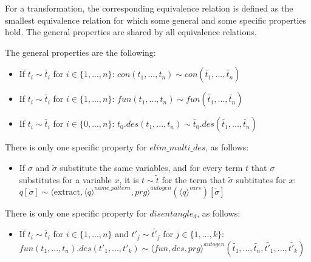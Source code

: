 \documentclass[11pt]{article} %
\begin{document}
For a transformation, the corresponding equivalence relation is defined as the smallest equivalence relation for which some general and some specific properties hold. The general properties are shared by all equivalence relations.

The general properties are the following:

\begin{itemize}

\item If $t_i \sim \widetilde{t_i}$ for $i \in \{1, ..., n\}$: $con(t_1, ..., t_n) \sim con(\widetilde{t_1}, ..., \widetilde{t_n})$

\item If $t_i \sim \widetilde{t_i}$ for $i \in \{1, ..., n\}$: $fun(t_1, ..., t_n) \sim fun(\widetilde{t_1}, ..., \widetilde{t_n})$

\item If $t_i \sim \widetilde{t_i}$ for $i \in \{0, ..., n\}$: $t_0.des(t_1, ..., t_n) \sim \widetilde{t_0}.des(\widetilde{t_1}, ..., \widetilde{t_n})$

\end{itemize}

There is only one specific property for $elim\_multi\_des$, as follows:

\begin{itemize}

\item If $\sigma$ and $\widetilde{\sigma}$ substitute the same variables, and for every term $t$ that $\sigma$ substitutes for a variable $x$, it is $t \sim \widetilde{t}$ for the term that $\widetilde{\sigma}$ subtitutes for $x$: $q[\sigma] \sim \langle \textrm{extract}, \langle q \rangle^{name\_pattern}, prg \rangle^{autogen}(\langle q \rangle^{vars})[\widetilde{\sigma}]$

\end{itemize}

There is only one specific property for $disentangle_d$, as follows:

\begin{itemize}

\item If $t_i \sim \widetilde{t_i}$ for $i \in \{1, ..., n\}$ and $t'_j \sim \widetilde{t'_j}$ for $j \in \{1, ..., k\}$: $fun(t_1, ..., t_n).des(t'_1, ..., t'_k) \sim \langle fun, des, prg \rangle^{autogen}(\widetilde{t_1}, ..., \widetilde{t_n}, \widetilde{t'_1}, ..., \widetilde{t'_k})$

\end{itemize}
\end{document}
